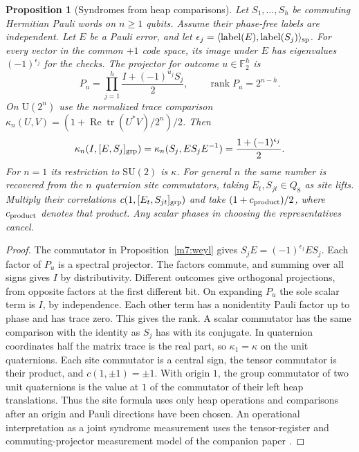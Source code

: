\documentclass[11pt,reqno]{amsart}
\newtheorem{proposition}[theorem]{Proposition}
\theoremstyle{definition}
\theoremstyle{remark}
\numberwithin{equation}{section}
\newcommand{\re}{\operatorname{Re}}
\newcommand{\SU}{\mathrm{SU}}
\begin{document}
\begin{proposition}[Syndromes from heap comparisons]\label{m7:syndrome}
Let $S_1,\ldots,S_h$ be commuting Hermitian Pauli words on
$n\ge1$ qubits. Assume their phase-free labels are independent.
Let $E$ be a Pauli error, and let
$\epsilon_j=\langle\operatorname{label}(E),
\operatorname{label}(S_j)\rangle_{\rm sp}$. For every vector in the
common $+1$ code space, its image under $E$ has eigenvalues
$(-1)^{\epsilon_j}$ for the checks. The projector for outcome
$u\in\mathbb F_2^h$ is
\[
 P_u=\prod_{j=1}^h\frac{I+(-1)^{u_j}S_j}{2},
 \qquad \operatorname{rank}P_u=2^{n-h}.
\]
On $\mathrm U(2^n)$ use the normalized trace comparison
$\kappa_n(U,V)=(1+\re\operatorname{tr}(U^*V)/2^n)/2$. Then
\[
 \kappa_n(I,[E,S_j]_{\rm grp})
 =\kappa_n(S_j,ES_jE^{-1})
 =\frac{1+(-1)^{\epsilon_j}}2 .
\]
For $n=1$ its restriction to $\SU(2)$ is $\kappa$.
For general $n$ the same number is recovered from the $n$
quaternion site commutators, taking $E_t,S_{jt}\in Q_8$ as site lifts. Multiply their correlations
$c(1,[E_t,S_{jt}]_{\rm grp})$ and take $(1+c_{\rm product})/2$, where $c_{\rm product}$ denotes that product.
Any scalar phases in choosing the representatives cancel.
\end{proposition}
\begin{proof}
The commutator in Proposition~\ref{m7:weyl} gives
$S_j E=(-1)^{\epsilon_j} E S_j$. Each factor of $P_u$ is a
spectral projector. The factors commute, and summing over all signs
gives $I$ by distributivity. Different outcomes give orthogonal
projections, from opposite factors at the first different bit.
On expanding $P_u$ the sole scalar term is $I$, by independence.
Each other term has a nonidentity Pauli factor up to phase and
has trace zero. This gives the rank. A scalar commutator has the
same comparison with the identity as $S_j$ has with its conjugate.
In quaternion coordinates half the matrix trace is the real part,
so $\kappa_1=\kappa$ on the unit quaternions. Each site commutator
is a central sign, the tensor commutator is their product, and
$c(1,\pm1)=\pm1$. With origin $1$, the group commutator of two
unit quaternions is the value at $1$ of the commutator of their left
heap translations. Thus the site formula uses only heap operations
and comparisons after an origin and Pauli directions have been chosen.
An operational interpretation as a joint syndrome measurement uses
the tensor-register and commuting-projector measurement model of
the companion paper \cite[Prop.~124]{Companion}.
\end{proof}
\end{document}
